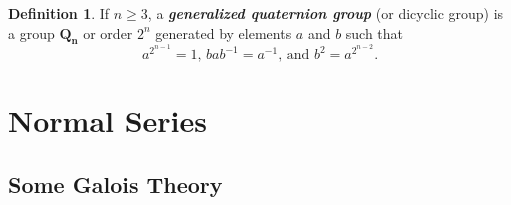 \documentclass[12pt]{report}
\theoremstyle{definition}
\newtheorem*{definition}{Definition}
\newcommand{\term}[1]{\textbf{\textit{#1}}}
\begin{document}
\begin{definition}
	If $n\geq 3$, a \term{generalized quaternion group} (or dicyclic group) is a group $\mathbf{Q_n}$ or order $2^n$ generated by elements $a$ and $b$ such that
	\[ a^{2^{n-1}}=1 \text{, } bab^{-1}=a^{-1} \text{, and } b^2=a^{2^{n-2}} \text{.} \]
\end{definition}

\chapter{Normal Series}

\section{Some Galois Theory}
\end{document}
